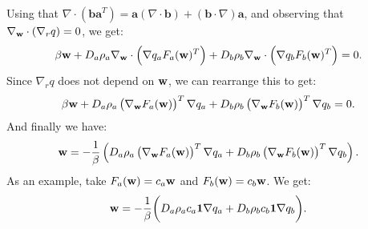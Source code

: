 	Using that $\nabla \cdot (\mathbf{b a}^T) = \mathbf a (\nabla \cdot \mathbf b) + (\mathbf b \cdot \nabla) \mathbf a$, and observing that $\nabla_{\mathbf{w}} \cdot (\nabla_r q) = 0$, we get:
	\begin{align*}
	\beta \mathbf{w}  + D_a \rho_a \nabla_{\mathbf{w}} \cdot \left(\nabla q_a F_a(\mathbf{w})^T \right) 
	+ D_b \rho_b \nabla_{\mathbf{w}} \cdot \left(\nabla q_b F_b(\mathbf{w})^T \right) = 0.
	\end{align*} 
	Since $\nabla_r q$ does not depend on $\mathbf{w}$, we can rearrange this to get:
	\begin{align*}
	\beta \mathbf{w}  + D_a \rho_a \left(\nabla_{\mathbf{w}} F_a(\mathbf{w})\right)^T \nabla q_a  
	+ D_b \rho_b \left(\nabla_{\mathbf{w}} F_b(\mathbf{w})\right)^T \nabla q_b = 0.
	\end{align*}
	And finally we have:
	\begin{align*}
	\mathbf{w} = - \frac{1}{\beta} \left( D_a \rho_a \left(\nabla_{\mathbf{w}} F_a(\mathbf{w})\right)^T \nabla q_a  
	+ D_b \rho_b \left(\nabla_{\mathbf{w}} F_b(\mathbf{w})\right)^T \nabla q_b \right).
	\end{align*}
    As an example, take $F_a(\mathbf{w}) = c_a \mathbf{w}$ and $F_b(\mathbf{w}) = c_b \mathbf{w}$. We get:
	\begin{align*}
	\mathbf{w}  = - \frac{1}{\beta}\bigg( D_a  \rho_a c_a \mathbf 1 \nabla q_a + D_b \rho_b c_b \mathbf 1 \nabla q_b \bigg).
	\end{align*}